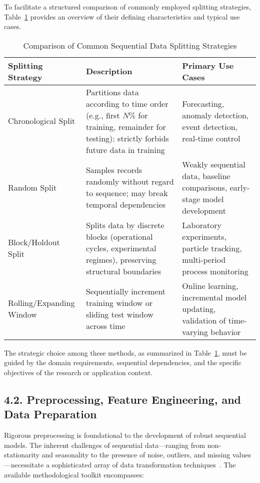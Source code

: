 \documentclass[11pt]{article}
\begin{document}
To facilitate a structured comparison of commonly employed splitting strategies, Table~\ref{tab:splitting_strategies} provides an overview of their defining characteristics and typical use cases.

\begin{table}[h!]
\caption{Comparison of Common Sequential Data Splitting Strategies}
\label{tab:splitting_strategies}
\centering
\begin{tabular}{|l|p{5cm}|p{5cm}|}
\hline
\textbf{Splitting Strategy} & \textbf{Description} & \textbf{Primary Use Cases} \\
\hline
Chronological Split & Partitions data according to time order (e.g., first $N$\% for training, remainder for testing); strictly forbids future data in training & Forecasting, anomaly detection, event detection, real-time control \\
\hline
Random Split & Samples records randomly without regard to sequence; may break temporal dependencies & Weakly sequential data, baseline comparisons, early-stage model development \\
\hline
Block/Holdout Split & Splits data by discrete blocks (operational cycles, experimental regimes), preserving structural boundaries & Laboratory experiments, particle tracking, multi-period process monitoring \\
\hline
Rolling/Expanding Window & Sequentially increment training window or sliding test window across time & Online learning, incremental model updating, validation of time-varying behavior \\
\hline
\end{tabular}
\end{table}

The strategic choice among these methods, as summarized in Table~\ref{tab:splitting_strategies}, must be guided by the domain requirements, sequential dependencies, and the specific objectives of the research or application context.

\subsection{4.2. Preprocessing, Feature Engineering, and Data Preparation}

Rigorous preprocessing is foundational to the development of robust sequential models. The inherent challenges of sequential data—ranging from non-stationarity and seasonality to the presence of noise, outliers, and missing values—necessitate a sophisticated array of data transformation techniques~\cite{ref5}. The available methodological toolkit encompasses:
\end{document}

